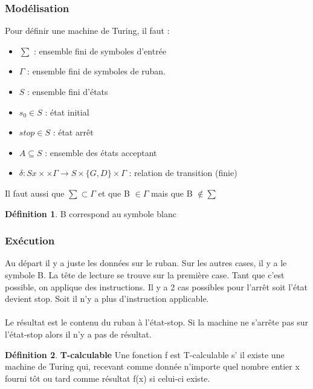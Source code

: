 \documentclass[11pt,a4paper]{article}
\theoremstyle{definition}
\newtheorem{mydef}{Définition}
\begin{document}

\subsubsection{Modélisation}
Pour définir une machine de Turing, il faut :
\begin{itemize}
	\item $\sum$ : ensemble fini de symboles d'entrée
	\item $\Gamma$ : ensemble fini de symboles de ruban.
	\item $S$ : ensemble fini d'états
	\item $s_0 \in S$ : état initial
	\item $stop \in S$ : état arrêt
	\item $A \subseteq S$ : ensemble des états acceptant
	\item $\delta : Sx\times \times \Gamma \rightarrow S \times \{G,D\} 
	\times \Gamma$ : relation de transition (finie)
\end{itemize}
Il faut aussi que $\sum \subset \Gamma$ et que B $\in \Gamma$ mais que B 
$\notin \sum$

\begin{mydef}
		B correspond au symbole blanc
\end{mydef}

\subsubsection{Exécution}
Au départ il y a juste les données sur le ruban. Sur les autres cases, il y a le 
symbole B. La tête de lecture se trouve sur la première case. Tant que c'est 
possible, on applique des instructions. Il y a 2 cas possibles pour l'arrêt soit 
l'état devient stop. Soit il n'y a plus d'instruction applicable.

\paragraph{} Le résultat est le contenu du ruban à l'état-stop. Si la machine 
ne s'arrête pas sur l'état-stop alors il n'y a pas de résultat.

\begin{mydef}
	\textbf{T-calculable} Une fonction f est T-calculable s’ il existe une machine de Turing qui, 
	recevant comme donnée n'importe quel nombre entier x fourni tôt ou tard 
	comme résultat f(x) si celui-ci existe.
\end{mydef}
\end{document}
